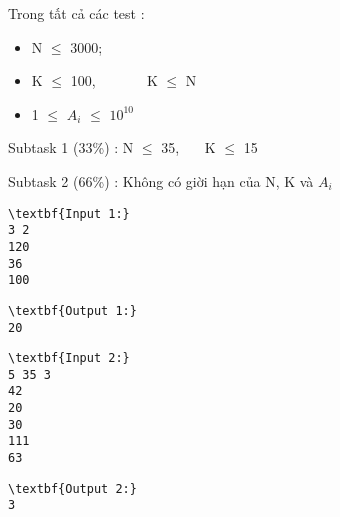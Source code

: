 Trong tất cả các test :
\begin{itemize}
	\item N  $\le$  3000;
	\item K  $\le$  100,        K  $\le$  N
	\item 1  $\le$  $A_{i}$  $\le$  $10^{10}$
\end{itemize}

Subtask 1 (33\%) : N  $\le$  35,    K  $\le$  15

Subtask 2 (66\%) : Không có giời hạn của N, K và $A_{i}$
\begin{verbatim}
\textbf{Input 1:}
3 2
120
36
100\end{verbatim}
\begin{verbatim}
\textbf{Output 1:}
20\end{verbatim}
\begin{verbatim}
\textbf{Input 2:}
5 35 3
42
20
30
111
63\end{verbatim}
\begin{verbatim}
\textbf{Output 2:}
3
\end{verbatim}
